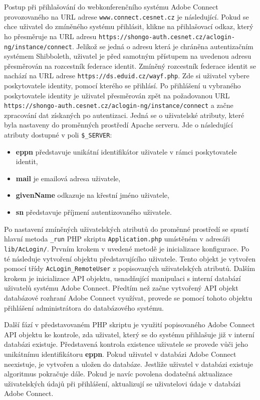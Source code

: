 \documentclass[
  printed, %
  twoside, %
  table,   %
  nolof,     %
  nolot,     %
]{fithesis3}
\begin{document}
Postup při přihlašování do webkonferenčního systému Adobe Connect provozovaného na URL adrese \texttt{www.connect.cesnet.cz} je následující. Pokud se chce uživatel do zmíněného systému přihlásit, klikne na přihlašovací odkaz, který ho přesměruje na URL adresu \texttt{https://shongo-auth.cesnet.cz/aclogin-ng/instance/connect}. Jelikož se jedná o adresu která je chráněna autentizačním systémem Shibboleth, uživatel je před samotným přístupem na uvedenou adresu přesměrován na rozcestník federace identit. Zmíněný rozcestník federace identit se nachází na URL adrese \texttt{https://ds.eduid.cz/wayf.php}. Zde si uživatel vybere poskytovatele identity, pomocí kterého se přihlásí. Po přihlášení u vybraného poskytovatele identity je uživatel  přesměrován zpět na požadovanou URL \texttt{https://shongo-auth.cesnet.cz/aclogin-ng/instance/connect} a začne zpracování dat získaných po autentizaci. Jedná se o uživatelské atributy, které byla nastaveny do proměnných prostředí Apache serveru. Jde o následující atributy dostupné v poli \texttt{\$\_SERVER}: 

\begin{itemize}
    \item \textbf{eppn} představuje unikátní identifikátor uživatele v rámci poskytovatele identit, 
    \item \textbf{mail} je emailová adresa uživatele, 
    \item \textbf{givenName} odkazuje na křestní jméno uživatele,
    \item \textbf{sn} představuje příjmení autentizovaného uživatele.
\end{itemize}
\label{item:adobe-connect}
Po nastavení zmíněných uživatelských atributů do proměnné prostředí se spustí hlavní metoda \texttt{\_run} PHP skriptu \texttt{Application.php} umístěném v adresáři \texttt{lib/AcLogin/}. Prvním krokem v uvedené metodě je inicializace konfigurace. Po té následuje vytvoření objektu představujícího uživatele. Tento objekt je vytvořen pomocí třídy \texttt{AcLogin\_RemoteUser} z popisovaných uživatelských atributů. Dalším krokem je inicializace API objektu, usnadňující manipulaci s interní databází uživatelů systému Adobe Connect. Předtím než začne vytvořený API objekt databázové rozhraní Adobe Connect využívat, provede se pomocí tohoto objektu přihlášení administrátora do databázového systému. \par 

Další fází v představovaném PHP skriptu je využití popisovaného Adobe Connect API objektu ke kontrole, zda uživatel, který se do systému přihlašuje již v interní databázi existuje. Představená kontrola existence uživatele se provede vůči jeho unikátnímu identifikátoru \textbf{eppn}. Pokud uživatel v databázi Adobe Connect neexistuje, je vytvořen a uložen do databáze. Jestliže uživatel v databázi existuje algoritmus pokračuje dále. Pokud je navíc povolena dodatečná aktualizace uživatelských údajů při přihlášení, aktualizují se uživatelovi údaje v databázi Adobe Connect. \par
\end{document}
